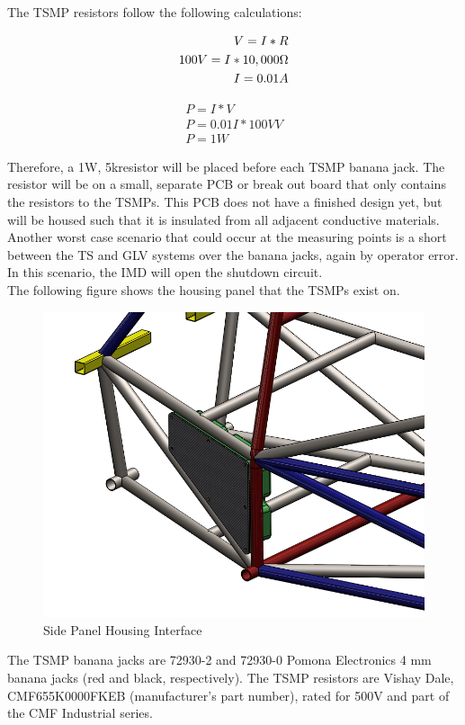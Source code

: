 \documentclass{article}
\begin{document}
    The TSMP resistors follow the following calculations:

                \begin{align}
                V = I * R \\
                100 V = I * 10,000 \ohm \\
                I = 0.01A
            \end{align}

            \begin{align}
                P = I * V \\
                P = 0.01 I * 100V V \\
                P = 1 W
            \end{align}

            Therefore, a 1W, 5k\ohm resistor will be placed before each TSMP banana jack. The resistor will be on a small, separate PCB or break out board that only contains the resistors to the TSMPs. This PCB does not have a finished design yet, but will be housed such that it is insulated from all adjacent conductive materials.\\

            Another worst case scenario that could occur at the measuring points is a short between the TS and GLV systems over the banana jacks, again by operator error. In this scenario, the IMD will open the shutdown circuit.
    \\
    The following figure shows the housing panel that the TSMPs exist on.

    \begin{figure}[H]
        \centering
        \includegraphics[width = 0.6 \textwidth]{CONTROLPANEL_1}
        \caption{Side Panel Housing Interface}
        \label{sidepanelfront}
    \end{figure}

    The TSMP banana jacks are 72930-2 and 72930-0 Pomona Electronics 4 mm banana jacks (red and black, respectively). The TSMP resistors are Vishay Dale, CMF655K0000FKEB (manufacturer's part number), rated for 500V and part of the CMF Industrial series.
\end{document}
